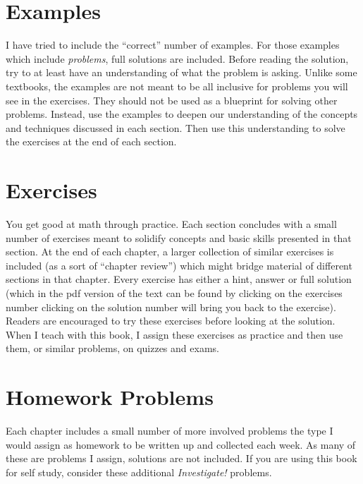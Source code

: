 \documentclass[10pt,]{book}
\theoremstyle{plain}
\theoremstyle{definition}
\theoremstyle{definition}
\theoremstyle{definition}
\begin{document}
\chapter*{Examples}\label{preface-4}

  I have tried to include the ``correct'' number of examples. For those examples which include \emph{problems}, full solutions are included. Before reading the solution, try to at least have an understanding of what the problem is asking. Unlike some textbooks, the examples are not meant to be all inclusive for problems you will see in the exercises. They should not be used as a blueprint for solving other problems. Instead, use the examples to deepen our understanding of the concepts and techniques discussed in each section. Then use this understanding to solve the exercises at the end of each section.
\chapter*{Exercises}\label{preface-5}

  You get good at math through practice. Each section concludes with a small number of exercises meant to solidify concepts and basic skills presented in that section. At the end of each chapter, a larger collection of similar exercises is included (as a sort of ``chapter review'') which might bridge material of different sections in that chapter. Every exercise has either a hint, answer or full solution (which in the pdf version of the text can be found by clicking on the exercises number \textendash{} clicking on the solution number will bring you back to the exercise). Readers are encouraged to try these exercises before looking at the solution. When I teach with this book, I assign these exercises as practice and then use them, or similar problems, on quizzes and exams.
\chapter*{Homework Problems}\label{preface-6}

       Each chapter includes a small number of more involved problems \textendash{} the type I would assign as homework to be written up and collected each week. As many of these are problems I assign, solutions are not included. If you are using this book for self study, consider these additional \emph{Investigate!} problems.
\end{document}
